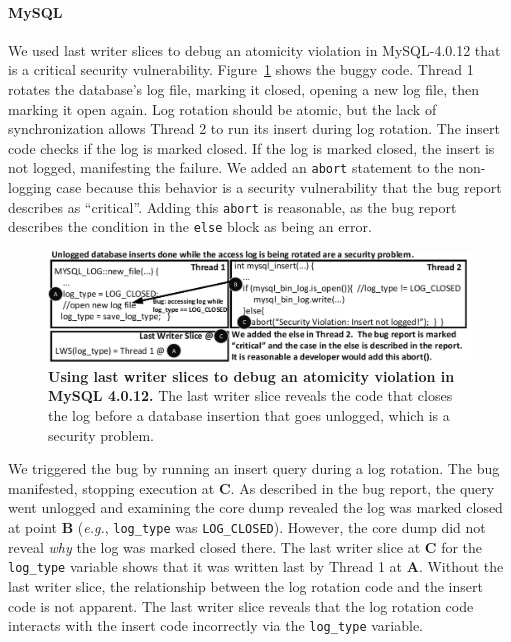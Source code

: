\documentclass[preprint,9pt]{sigplanconf}
\begin{document}
\paragraph{MySQL}

We used last writer slices to debug an atomicity violation in MySQL-4.0.12 that
is a critical security vulnerability.  Figure~\ref{fig:mysqllws} shows the
buggy code.  Thread 1 rotates the database's log file, marking it closed,
opening a new log file, then marking it open again.  Log rotation should be
atomic, but the lack of synchronization allows Thread 2 to run its insert
during log rotation.  The insert code checks if the log is marked closed. If
the log is marked closed, the insert is not logged, manifesting the failure.
We added an {\tt abort} statement to the non-logging case because this behavior
is a security vulnerability that the bug report describes as ``critical''.
Adding this {\tt abort} is reasonable, as the bug report describes the
condition in the {\tt else} block as being an error.

\begin{figure}[h]
\centering
\includegraphics[width=\columnwidth]{figs/MySQLDebug.pdf}
\caption{\label{fig:mysqllws}{\bf Using last writer slices to debug an
atomicity violation in MySQL 4.0.12.} The last writer slice reveals the code that closes the log before a database insertion that goes unlogged, which is a security problem.}
\end{figure}

We triggered the bug by running an insert query during a log rotation.  The bug
manifested, stopping execution at {\bf C}.  As described in the bug report, the
query went unlogged and examining the core dump revealed the log was marked
closed at point {\bf B} ({\em e.g.}, {\tt log\_type} was {\tt LOG\_CLOSED}).
However, the core dump did not reveal {\em why} the log was marked closed
there.  The last writer slice at {\bf C} for the {\tt log\_type} variable shows
that it was written last by Thread 1 at {\bf A}.  Without the last writer
slice, the relationship between the log rotation code and the insert code is
not apparent. The last writer slice reveals that the log rotation code
interacts with the insert code incorrectly via the {\tt log\_type} variable.  
\end{document}
